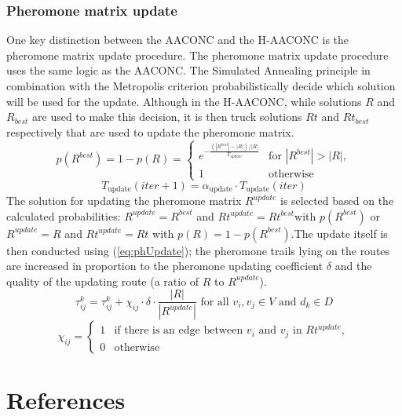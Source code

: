 \documentclass{article}
\begin{document}
	\subsubsection{Pheromone matrix update}
	One key distinction between the AACONC and the H-AACONC is the pheromone matrix update procedure.
	The pheromone matrix update procedure uses the same logic as the AACONC. The Simulated Annealing principle in combination with the Metropolis criterion probabilistically decide which solution will be used for the update. Although in the H-AACONC, while solutions $R$ and $R_{best}$ are used to make this decision, it is then truck solutions $Rt$ and $Rt_{best}$ respectively that are used to update the pheromone matrix.
	\begin{equation}
		p(R^{best}) = 1 - p(R) = 
		\begin{cases}
			e^{-\frac{(|R^{best}| - |R|)/|R|}{T_{update}}} & \text{for } |R^{best}| > |R|, \\
			1 & \text{otherwise}
		\end{cases}
		\label{eq:SA}
	\end{equation}
	\begin{equation}
		T_{\text{update}}(iter + 1) = \alpha_{\text{update}} \cdot T_{\text{update}}(iter)
		\label{eq:Tupdate}
	\end{equation}
	The solution for updating the pheromone matrix $R^{update}$ is selected based on the calculated probabilities:
	$R^{update} = R^{best}$ and $Rt^{update} = Rt^{best}$with $p(R^{best})$ or $R^{update} = R$ and $Rt^{update} = Rt$ with $p(R) = 1 - p(R^{best})$.The update itself is then conducted using (\ref{eq:phUpdate}); the pheromone trails lying on the routes are increased in proportion to the pheromone
	updating coefficient $\delta$ and the quality of the updating route (a ratio of $R$ to $R^{update}$).
	\begin{equation}
		\tau_{ij}^k = \tau_{ij}^k + \chi_{ij}\cdot \delta \cdot \frac{|R|}{|R^{update}|} \text{ for all } v_i,v_j \in V \text{ and } d_k\in D
		\label{eq:phUpdate}
	\end{equation}
	\begin{equation}
		\chi_{ij} = 
		\begin{cases}
			1 & \text{if there is an edge between }v_i \text{ and }v_j \text{ in }Rt^{update},\\
			0 & \text{otherwise}
		\end{cases}
	\end{equation}
	\;
	\clearpage
	\section{References}
\end{document}
